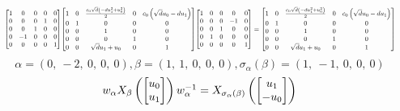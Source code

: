 \documentclass[11pt]{article}
\theoremstyle{definition}
\begin{document}
\[
\scaletoalign{\textwidth}{{\left[\begin{matrix}1 & 0 & 0 & 0 & 0\\0 & 0 & 0 & 1 & 0\\0 & 0 & 1 & 0 & 0\\0 & -1 & 0 & 0 & 0\\0 & 0 & 0 & 0 & 1\end{matrix}\right]} {\left[\begin{matrix}1 & 0 & \frac{c_{0} \sqrt{d} \left(- d u_{1}^{2} + u_{0}^{2}\right)}{2} & 0 & c_{0} \left(\sqrt{d} u_{0} - d u_{1}\right)\\0 & 1 & 0 & 0 & 0\\0 & 0 & 1 & 0 & 0\\0 & 0 & 0 & 1 & 0\\0 & 0 & \sqrt{d} u_{1} + u_{0} & 0 & 1\end{matrix}\right]} {\left[\begin{matrix}1 & 0 & 0 & 0 & 0\\0 & 0 & 0 & -1 & 0\\0 & 0 & 1 & 0 & 0\\0 & 1 & 0 & 0 & 0\\0 & 0 & 0 & 0 & 1\end{matrix}\right]} = {\left[\begin{matrix}1 & 0 & \frac{c_{0} \sqrt{d} \left(- d u_{1}^{2} + u_{0}^{2}\right)}{2} & 0 & c_{0} \left(\sqrt{d} u_{0} - d u_{1}\right)\\0 & 1 & 0 & 0 & 0\\0 & 0 & 1 & 0 & 0\\0 & 0 & 0 & 1 & 0\\0 & 0 & \sqrt{d} u_{1} + u_{0} & 0 & 1\end{matrix}\right]}}
\]
\[
\alpha = \left( 0, \  -2, \  0, \  0, \  0\right), \beta = \left( 1, \  1, \  0, \  0, \  0\right), \sigma_{\alpha}(\beta) = \left( 1, \  -1, \  0, \  0, \  0\right)
\]
\[
\scaletoalign{\textwidth}{w_{\alpha} X_{\beta}\left(\left[\begin{matrix}u_{0}\\u_{1}\end{matrix}\right]\right) w_{\alpha}^{-1} = X_{\sigma_{\alpha}\left(\beta\right)}\left(\left[\begin{matrix}u_{1}\\- u_{0}\end{matrix}\right]\right)}
\]
\end{document}
